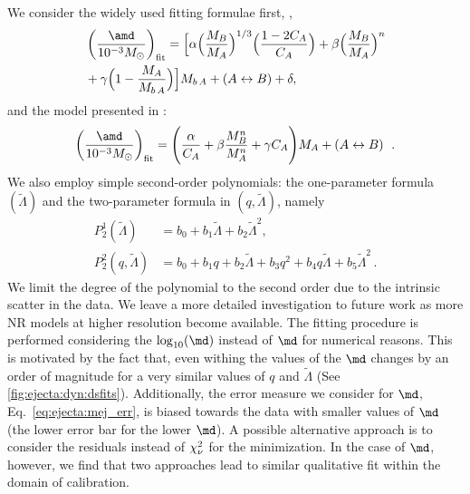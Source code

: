 We consider the widely used fitting formulae first, 
\citep{Kawaguchi:2016ana,Dietrich:2016fpt,Radice:2018pdn}, 
%
\begin{eqnarray}
\label{eq:fit_Mej}
&\left(\frac{\amd}{10^{-3}M_{\odot}}\right)_{\rm fit} =
\Big[\alpha\Big(\frac{M_B}{M_A}\Big)^{1/3}\Big(\frac{1-2C_A}{C_A}\Big)+  
\beta\Big(\frac{M_B}{M_A}\Big)^n \\
&+ \gamma\Big(1-\frac{M_A}{M_{b\,A}} \Big)\Big]M_{b\,A} + (A\leftrightarrow B) + \delta\non,
\end{eqnarray}
%
and the model presented in \citet{Kruger:2020gig}:
%
\begin{equation}
\label{eq:fit_Mej_Kruger}
\left(\frac{\amd}{10^{-3}M_{\odot}}\right)_{\rm fit} =
\left(\frac{\alpha}{C_A} + \beta\frac{M_B ^n}{M_A ^n} + \gamma
C_A\Bigg)M_A + (A\leftrightarrow B)\right. \ .
\end{equation}
%
We also employ simple second-order polynomials: 
the one-parameter formula $(\tilde\Lambda)$ and the two-parameter
formula in $(q,\tilde\Lambda)$, namely
%
\begin{align}\label{eq:polyfit2}
P_2 ^1(\tilde{\Lambda}) &= b_0 + b_1\tilde\Lambda + b_2 \tilde\Lambda^2, \\\label{eq:polyfit22}
P_2 ^2(q,\tilde\Lambda) &= b_0 + b_1q + b_2\tilde\Lambda + b_3q ^2 +  b_4 q \tilde\Lambda + b_5\tilde\Lambda^2 \, .
\end{align}
%
We limit the degree of the polynomial to the second order due to the intrinsic 
scatter in the data. We leave a more detailed investigation to future work as 
more \ac{NR} models at higher resolution become available.
%
The fitting procedure is performed considering the $\log_{10}(\md)$ instead of 
$\md$ for numerical reasons. This is motivated by the fact that, even withing 
\DSrefset{} the values of the $\md$ changes by an order of magnitude for a very 
similar values of $q$ and $\tilde{\Lambda}$ (See \ref{fig:ejecta:dyn:dsfits}).
%
Additionally, the error measure we consider for $\md$, Eq.~\eqref{eq:ejecta:mej_err}, 
is biased towards the data with smaller values of $\md$ (the lower error bar for the 
lower $\md$). A possible alternative approach is to consider the residuals instead of 
$\chi_{\nu}^2$ for the minimization. In the case of $\md$, however, we find that two 
approaches lead to similar qualitative fit within the domain of calibration.
%
